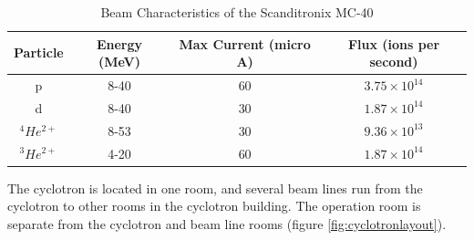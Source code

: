 \begin{table}[h]
\begin{center}
\begin{tabular}{c c c c}
\hline\hline
Particle & Energy (MeV) & Max Current (micro A) & Flux (ions per second)\\
\hline\hline
p & 8-40 & 60 & $3.75 \times 10^{14}$ \\
d & 8-40 & 30 & $1.87 \times 10^{14}$ \\
${}^4 He^{2+}$ & 8-53 & 30 & $9.36 \times 10^{13}$ \\
${}^3 He^{2+}$ & 4-20 & 60 & $1.87 \times 10^{14}$ \\
\hline\hline
\end{tabular}
\end{center}
\caption{Beam Characteristics of the Scanditronix MC-40}
\label{table:scanditronixlimits}
\end{table}

The cyclotron is located in one room, and several beam lines run from the cyclotron to other rooms in the cyclotron building.  The operation room is separate from the cyclotron and beam line rooms (figure \ref{fig:cyclotronlayout}).

